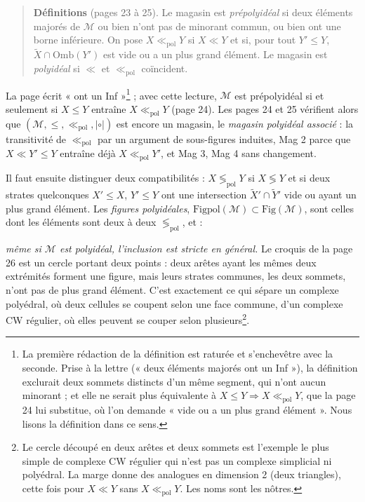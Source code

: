 \documentclass[11pt,a4paper]{article}
\begin{document}
\begin{quote}
\textbf{Définitions} (pages 23 à 25). Le magasin est \emph{prépolyidéal} si
deux éléments majorés de $\mathcal{M}$ ou bien n'ont pas de minorant commun, ou
bien ont une borne inférieure. On pose $X \ll_{\mathrm{pol}} Y$ si $X \ll Y$ et
si, pour tout $Y' \leq Y$, $\widetilde{X} \cap \mathrm{Omb}(Y')$ est vide ou a
un plus grand élément. Le magasin est \emph{polyidéal} si $\ll$ et
$\ll_{\mathrm{pol}}$ coïncident.
\end{quote}

La page écrit « ont un Inf »\footnote{La première rédaction de la définition
est raturée et s'enchevêtre avec la seconde. Prise à la lettre (« deux éléments
majorés ont un Inf »), la définition exclurait deux sommets distincts d'un même
segment, qui n'ont aucun minorant ; et elle ne serait plus équivalente à $X \leq
Y \Rightarrow X \ll_{\mathrm{pol}} Y$, que la page 24 lui substitue, où l'on
demande « vide ou a un plus grand élément ». Nous lisons la définition dans ce
sens.} ; avec cette lecture, $\mathcal{M}$ est prépolyidéal si et seulement si
$X \leq Y$ entraîne $X \ll_{\mathrm{pol}} Y$ (page 24). Les pages 24 et 25
vérifient alors que $(\mathcal{M}, \leq, \ll_{\mathrm{pol}}, \mathrel{|\circ|})$
est encore un magasin, le \emph{magasin polyidéal associé} : la transitivité de
$\ll_{\mathrm{pol}}$ par un argument de sous-figures induites, Mag 2 parce que
$X \ll Y' \leq Y$ entraîne déjà $X \ll_{\mathrm{pol}} Y'$, et Mag 3, Mag 4 sans
changement.

Il faut ensuite distinguer deux compatibilités : $X \lessgtr_{\mathrm{pol}} Y$
si $X \lessgtr Y$ et si deux strates quelconques $X' \leq X$, $Y' \leq Y$ ont une
intersection $\widetilde{X}' \cap \widetilde{Y}'$ vide ou ayant un plus grand
élément. Les \emph{figures polyidéales}, $\mathrm{Figpol}(\mathcal{M}) \subset
\mathrm{Fig}(\mathcal{M})$, sont celles dont les éléments sont deux à deux
$\lessgtr_{\mathrm{pol}}$, et :

\emph{même si $\mathcal{M}$ est polyidéal, l'inclusion est stricte en
général.} Le croquis de la page 26 est un cercle portant deux points : deux
arêtes ayant les mêmes deux extrémités forment une figure, mais leurs
strates communes, les deux sommets, n'ont pas de plus grand élément. C'est
exactement ce qui sépare un complexe polyédral, où deux cellules se coupent
selon une face commune, d'un complexe CW régulier, où elles peuvent se couper
selon plusieurs\footnote{Le cercle découpé en deux arêtes et deux sommets est
l'exemple le plus simple de complexe CW régulier qui n'est pas un complexe
simplicial ni polyédral. La marge donne des analogues en dimension 2 (deux
triangles), cette fois pour $X \ll Y$ sans $X \ll_{\mathrm{pol}} Y$. Les noms
sont les nôtres.}.
\end{document}
